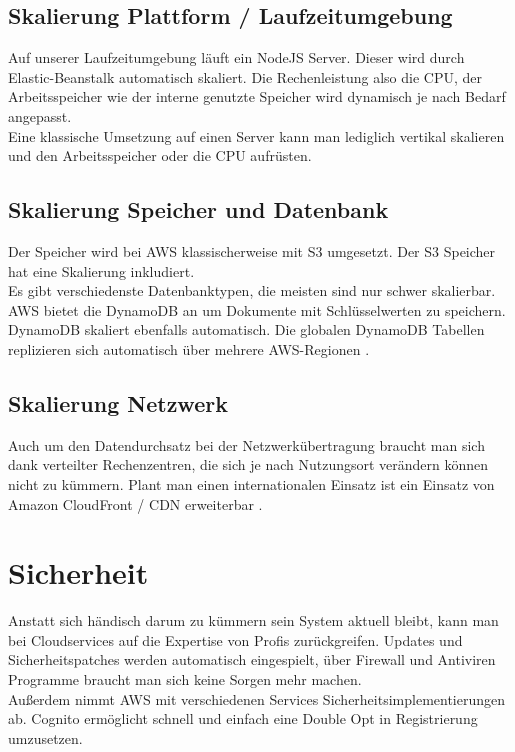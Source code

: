 \documentclass[a4paper, 12pt]{scrreprt}
\renewcommand\_{\textunderscore\allowbreak}
\begin{document}
\subsection{Skalierung Plattform / Laufzeitumgebung}
Auf unserer Laufzeitumgebung läuft ein NodeJS Server. Dieser wird durch Elastic-Beanstalk automatisch skaliert. Die Rechenleistung also die CPU, der Arbeitsspeicher wie der interne genutzte Speicher wird dynamisch je nach Bedarf angepasst. \\
Eine klassische Umsetzung auf einen Server kann man lediglich vertikal skalieren und den Arbeitsspeicher oder die CPU aufrüsten. 
\subsection{Skalierung Speicher und Datenbank}
Der Speicher wird bei AWS klassischerweise mit S3 umgesetzt. Der S3 Speicher hat eine Skalierung inkludiert. \\
Es gibt verschiedenste Datenbanktypen, die meisten sind nur schwer skalierbar. AWS bietet die DynamoDB an um Dokumente mit Schlüsselwerten zu speichern. DynamoDB skaliert ebenfalls automatisch. Die globalen DynamoDB Tabellen replizieren sich automatisch über mehrere AWS-Regionen \cite{AWSa}.\\
\subsection{Skalierung Netzwerk}
Auch um den Datendurchsatz bei der Netzwerkübertragung  braucht man sich dank verteilter Rechenzentren, die sich je nach Nutzungsort verändern können nicht zu kümmern. Plant man einen internationalen Einsatz ist ein Einsatz von Amazon CloudFront / CDN erweiterbar \cite{AWSb}.%
\section{Sicherheit}
Anstatt sich händisch darum zu kümmern sein System aktuell bleibt, kann man bei Cloudservices auf die Expertise von Profis zurückgreifen. Updates und Sicherheitspatches werden automatisch eingespielt, über Firewall und Antiviren Programme braucht man sich keine Sorgen mehr machen. \\
Außerdem nimmt AWS mit verschiedenen Services Sicherheitsimplementierungen ab. Cognito ermöglicht schnell und einfach eine Double Opt in Registrierung umzusetzen.
\end{document}
